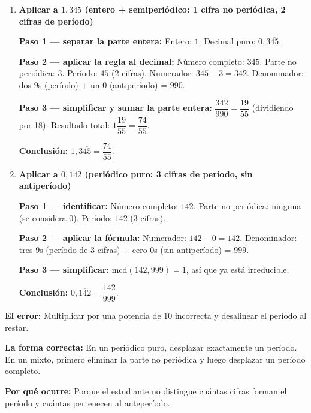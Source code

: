 \documentclass[11pt, letterpaper]{article}
\begin{document}
\begin{tcolorbox}[examplebox, title={Ejemplos --- Convertir decimal a fracci\'on}]
\begin{enumerate}[label=\textbf{Ej. \arabic*.}, leftmargin=*, itemsep=16pt]
\medskip
\textbf{Paso 2 --- aplicar la fórmula:}
Numerador: $25 - 2 = 23$.
Denominador: un $9$ (período de 1 cifra) + un $0$ (antiperíodo de 1 cifra) = $90$.

\medskip
\textbf{Conclusión:} $0{,}2\overline{5}=\dfrac{23}{90}$. \checkmark

\item \textbf{Aplicar a $1{,}3\overline{45}$ (entero + semiperiódico: 1 cifra no periódica, 2 cifras de período)}

\textbf{Paso 1 --- separar la parte entera:}
Entero: $1$. Decimal puro: $0{,}3\overline{45}$.

\medskip
\textbf{Paso 2 --- aplicar la regla al decimal:}
Número completo: $345$. Parte no periódica: $3$. Período: $45$ (2 cifras).
Numerador: $345 - 3 = 342$.
Denominador: dos $9$s (período) + un $0$ (antiperíodo) = $990$.

\medskip
\textbf{Paso 3 --- simplificar y sumar la parte entera:}
$\dfrac{342}{990}=\dfrac{19}{55}$ (dividiendo por 18).
Resultado total: $1\dfrac{19}{55}=\dfrac{74}{55}$.

\medskip
\textbf{Conclusión:} $1{,}3\overline{45}=\dfrac{74}{55}$. \checkmark

\item \textbf{Aplicar a $0{,}\overline{142}$ (periódico puro: 3 cifras de período, sin antiperíodo)}

\textbf{Paso 1 --- identificar:}
Número completo: $142$. Parte no periódica: ninguna (se considera $0$). Período: $142$ (3 cifras).

\medskip
\textbf{Paso 2 --- aplicar la fórmula:}
Numerador: $142 - 0 = 142$.
Denominador: tres $9$s (período de 3 cifras) + cero $0$s (sin antiperíodo) = $999$.

\medskip
\textbf{Paso 3 --- simplificar:}
$\text{mcd}(142,999)=1$, así que ya está irreducible.

\medskip
\textbf{Conclusión:} $0{,}\overline{142}=\dfrac{142}{999}$. \checkmark

\end{enumerate}
\end{tcolorbox}

\begin{tcolorbox}[warningbox, title={Error frecuente --- Elegir mal la potencia de 10}]
\noindent\textbf{El error:}
Multiplicar por una potencia de 10 incorrecta y desalinear el per\'iodo al restar.

\medskip
\noindent\textbf{La forma correcta:}
En un peri\'odico puro, desplazar exactamente un per\'iodo. En un mixto, primero eliminar la parte no peri\'odica y luego desplazar un per\'iodo completo.

\medskip
\noindent\textbf{Por qu\'e ocurre:}
Porque el estudiante no distingue cu\'antas cifras forman el per\'iodo y cu\'antas pertenecen al anteper\'iodo.
\end{tcolorbox}
\end{document}

